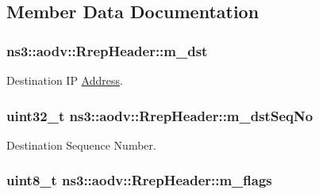 \subsection{Member Data Documentation}
\subsubsection[{\texorpdfstring{m\+\_\+dst}{m_dst}}]{ ns3\+::aodv\+::\+Rrep\+Header\+::m\+\_\+dst\hspace{0.3cm}{\ttfamily [private]}}\hypertarget{classns3_1_1aodv_1_1RrepHeader_aa9c52642173e2579173d70d47f680aef}{}\label{classns3_1_1aodv_1_1RrepHeader_aa9c52642173e2579173d70d47f680aef}


Destination IP \hyperlink{classns3_1_1Address}{Address}. 

\subsubsection[{\texorpdfstring{m\+\_\+dst\+Seq\+No}{m_dstSeqNo}}]{\setlength{\rightskip}{0pt plus 5cm}uint32\+\_\+t ns3\+::aodv\+::\+Rrep\+Header\+::m\+\_\+dst\+Seq\+No\hspace{0.3cm}{\ttfamily [private]}}\hypertarget{classns3_1_1aodv_1_1RrepHeader_a9024023f050c8650031234b8f2a60cb6}{}\label{classns3_1_1aodv_1_1RrepHeader_a9024023f050c8650031234b8f2a60cb6}


Destination Sequence Number. 

\subsubsection[{\texorpdfstring{m\+\_\+flags}{m_flags}}]{\setlength{\rightskip}{0pt plus 5cm}uint8\+\_\+t ns3\+::aodv\+::\+Rrep\+Header\+::m\+\_\+flags\hspace{0.3cm}{\ttfamily [private]}}\hypertarget{classns3_1_1aodv_1_1RrepHeader_abad4f56856926c4769c14ba3b87cc346}{}\label{classns3_1_1aodv_1_1RrepHeader_abad4f56856926c4769c14ba3b87cc346}


